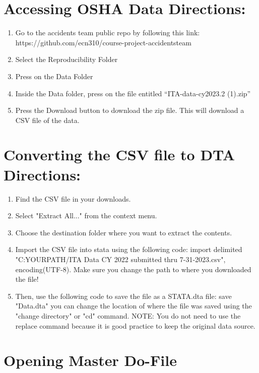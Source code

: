 \documentclass[12pt]{article}
\begin{document}
\section*{Accessing OSHA Data Directions:}

\begin{enumerate}
  \item Go to the accidents team public repo by following this link: https://github.com/ecn310/course-project-accidentsteam
  \item Select the Reproducibility Folder 
  \item Press on the Data Folder 
  \item Inside the Data folder, press on the file entitled “ITA-data-cy2023.2 (1).zip”
  \item Press the Download button to download the zip file. This will download a CSV file of the data.
\end{enumerate}

\section*{Converting the CSV file to DTA Directions:}

\begin{enumerate}
  \item Find the CSV file in your downloads.
  \item Select "Extract All..." from the context menu.
  \item Choose the destination folder where you want to extract the contents.
  \item Import the CSV file into stata using the following code: import delimited "C:YOURPATH/ITA Data CY 2022 submitted thru 7-31-2023.csv", encoding(UTF-8). Make sure you change the path to where you downloaded the file!
  \item Then, use the following code to save the file as a STATA.dta file: save "Data.dta" you can change the location of where the file was saved using the "change directory" or "cd" command. NOTE: You do not need to use the replace command because it is good practice to keep the original data source.
\end{enumerate}

\section*{Opening Master Do-File}
\end{document}
